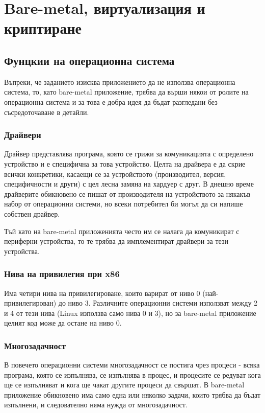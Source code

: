 \chapter{Bare-metal, виртуализация и криптиране}
\hfill
\section{Фунцкии на операционна система}
Въпреки, че заданието изисква приложението да не използва операционна система, то, като bare-metal приложение, трябва да върши някои от ролите на операционна система и за това е добра идея да бъдат разгледани без съсредоточаване в детайли.
  \subsection{Драйвери}
  Драйвер представлява програма, която се грижи за комуникацията с определено устройство и е специфична за това устройство. Целта на драйвера е да скрие всички конкретики, касаещи се за устройството (производител, версия, специфичности и други) с цел лесна замяна на хардуер с друг. В днешно време драйверите обикновено се пишат от производителя на устройството за някакъв набор от операционни системи, но всеки потребител би могъл да си напише собствен драйвер.

  Тъй като на bare-metal приложенията често им се налага да комуникират с периферни устройства, то те трябва да имплементират драйвери за тези устройства.

  \subsection{Нива на привилегия при x86} \label{rings}
  Има четири нива на привилегироване, които варират от ниво 0 (най-приви\-ле\-ги\-рован) до ниво 3.\cite[глава~6.4.5]{intel-manual-1} Различните операционни системи използват между 2 и 4 от тези нива (Linux използва само нива 0 и 3), но за bare-metal приложение целият код може да остане на ниво 0.

  \subsection{Многозадачност}
  В повечето операционни системи многозадачност се постига чрез процеси - всяка програма, която се изпълнява, се изпълнява в процес, и процесите се редуват кога ще се изпълняват и кога ще чакат другите процеси да свършат. В bare-metal приложение обикновено има само една или няколко задачи, които трябва да бъдат изпълнени, и следователно няма нужда от многозадачност.

